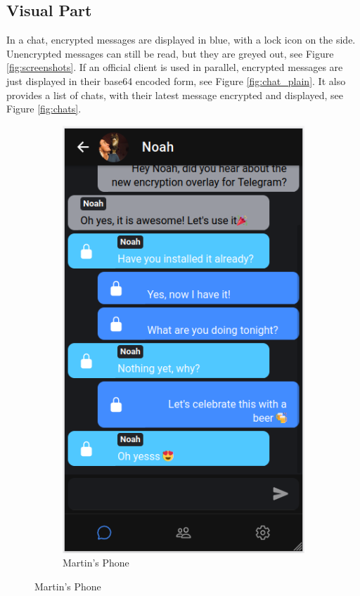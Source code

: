 \documentclass[a4paper, oneside]{discothesis}
\begin{document}
\subsection{Visual Part}

In a chat, encrypted messages are displayed in blue, with a lock icon on the side. Unencrypted messages can still be read, but they are greyed out, see Figure \ref{fig:screenshots}. If an official client is used in parallel, encrypted messages are just displayed in their base64 encoded form, see Figure \ref{fig:chat_plain}. It also provides a list of chats, with their latest message encrypted and displayed, see Figure \ref{fig:chats}.

\begin{figure}[h]
\begin{subfigure}{.5\textwidth}
  \centering
  \includegraphics[width=.8\linewidth]{figures/chat_martin.png}
  \caption{Martin's Phone}

\end{subfigure}
\end{figure}
\end{document}
